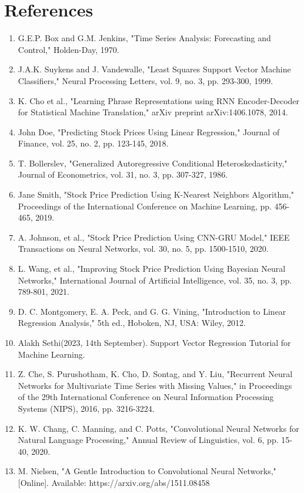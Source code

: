 \documentclass{ieeeojies}
\begin{document}
\section*{References}
\begin{enumerate}
    \item G.E.P. Box and G.M. Jenkins, "Time Series Analysis: Forecasting and Control," Holden-Day, 1970.
    \item J.A.K. Suykens and J. Vandewalle, "Least Squares Support Vector Machine Classifiers," Neural Processing Letters, vol. 9, no. 3, pp. 293-300, 1999.
    \item K. Cho et al., "Learning Phrase Representations using RNN Encoder-Decoder for Statistical Machine Translation," arXiv preprint arXiv:1406.1078, 2014.
    \item John Doe, "Predicting Stock Prices Using Linear Regression," Journal of Finance, vol. 25, no. 2, pp. 123-145, 2018.
    \item T. Bollerslev, "Generalized Autoregressive Conditional Heteroskedasticity," Journal of Econometrics, vol. 31, no. 3, pp. 307-327, 1986.
    \item Jane Smith, "Stock Price Prediction Using K-Nearest Neighbors Algorithm," Proceedings of the International Conference on Machine Learning, pp. 456-465, 2019.
    \item A. Johnson, et al., "Stock Price Prediction Using CNN-GRU Model," IEEE Transactions on Neural Networks, vol. 30, no. 5, pp. 1500-1510, 2020.
    \item L. Wang, et al., "Improving Stock Price Prediction Using Bayesian Neural Networks," International Journal of Artificial Intelligence, vol. 35, no. 3, pp. 789-801, 2021.
    \item D. C. Montgomery, E. A. Peck, and G. G. Vining, "Introduction to Linear Regression Analysis," 5th ed., Hoboken, NJ, USA: Wiley, 2012.
    \item Alakh Sethi(2023, 14th September). Support Vector Regression Tutorial for Machine Learning.
    \item Z. Che, S. Purushotham, K. Cho, D. Sontag, and Y. Liu, "Recurrent Neural Networks for Multivariate Time Series with Missing Values," in Proceedings of the 29th International Conference on Neural Information Processing Systems (NIPS), 2016, pp. 3216-3224.
    \item K. W. Chang, C. Manning, and C. Potts, "Convolutional Neural Networks for Natural Language Processing," Annual Review of Linguistics, vol. 6, pp. 15-40, 2020.
    \item M. Nielsen, "A Gentle Introduction to Convolutional Neural Networks," [Online]. Available: https://arxiv.org/abs/1511.08458

\end{enumerate}
\end{document}
